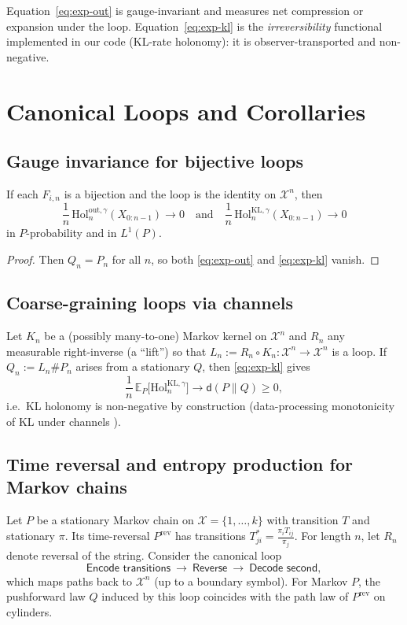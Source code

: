 \documentclass[11pt]{article}
\newcommand{\X}{\mathcal{X}}
\newcommand{\E}{\mathbb{E}}
\newcommand{\1}{\mathbbm{1}}
\newcommand{\push}{\#}
\begin{document}
\begin{remark}[Scope]
Equation~\eqref{eq:exp-out} is gauge-invariant and measures net compression or expansion under the loop. Equation~\eqref{eq:exp-kl} is the \emph{irreversibility} functional implemented in our code (KL-rate holonomy): it is observer-transported and non-negative.
\end{remark}

\section{Canonical Loops and Corollaries}

\subsection{Gauge invariance for bijective loops}

\begin{corollary}\label{cor:gauge}
If each $F_{i,n}$ is a bijection and the loop is the identity on $\X^n$, then
\[
\frac{1}{n}\,\mathrm{Hol}_{n}^{\mathrm{out},\gamma}(X_{0:n-1}) \to 0
\quad\text{and}\quad
\frac{1}{n}\,\mathrm{Hol}_{n}^{\mathrm{KL},\gamma}(X_{0:n-1}) \to 0
\]
in $P$-probability and in $L^1(P)$.
\end{corollary}
\begin{proof}
Then $Q_n=P_n$ for all $n$, so both \eqref{eq:exp-out} and \eqref{eq:exp-kl} vanish.
\end{proof}

\subsection{Coarse-graining loops via channels}
Let $K_n$ be a (possibly many-to-one) Markov kernel on $\X^n$ and $R_n$ any measurable right-inverse (a ``lift'') so that $L_n:=R_n\circ K_n:\X^n\to\X^n$ is a loop. If $Q_n:=L_n\push P_n$ arises from a stationary $Q$, then \eqref{eq:exp-kl} gives
\[
\frac{1}{n}\,\E_P\big[\mathrm{Hol}_{n}^{\mathrm{KL},\gamma}\big] \to \mathsf{d}(P\|Q) \ge 0,
\]
i.e.\ KL holonomy is non-negative by construction (data-processing monotonicity of KL under channels \cite[Ch.~2]{coverthomas}).

\subsection{Time reversal and entropy production for Markov chains}

Let $P$ be a stationary Markov chain on $\X=\{1,\dots,k\}$ with transition $T$ and stationary $\pi$. Its time-reversal $P^{\mathrm{rev}}$ has transitions $T^\ast_{ji}=\frac{\pi_i T_{ij}}{\pi_j}$. For length $n$, let $R_n$ denote reversal of the string. Consider the canonical loop
\[
\textsf{Encode transitions}\ \to\ \textsf{Reverse}\ \to\ \textsf{Decode second},
\]
which maps paths back to $\X^n$ (up to a boundary symbol). For Markov $P$, the pushforward law $Q$ induced by this loop coincides with the path law of $P^{\mathrm{rev}}$ on cylinders.
\end{document}

